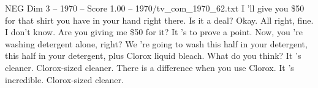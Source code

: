 \begin{textsample}{NEG Dim 3 – 1970 – Score 1.00 – 1970/tv\_com\_1970\_62.txt}  \label{ex:f3_neg_069}
I 'll give you \$50 for that shirt you have in your hand right there.
Is it a deal?
Okay.
All right, fine.
I don't know.
Are you giving me \$50 for it?
It 's to prove a point.
Now, you 're washing detergent alone, right?
We 're going to wash this half in your detergent, this half in your detergent, plus Clorox liquid bleach.
What do you think?
It 's cleaner.
Clorox-sized cleaner.
There is a difference when you use Clorox.
It 's incredible.
Clorox-sized cleaner.

\end{textsample}
